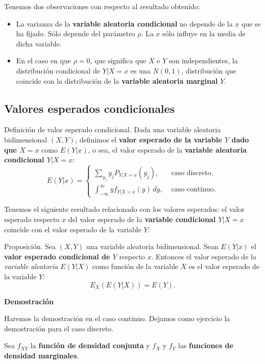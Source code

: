 \documentclass[]{book}
\begin{document}
Tenemos dos observaciones con respecto al resultado obtenido:

\begin{itemize}
\item
  La varianza de la \textbf{variable aleatoria condicional} no depende de la \(x\) que se ha fijado. Sólo depende del parámetro \(\rho\). La \(x\) sólo influye en la media de dicha variable.
\item
  En el caso en que \(\rho=0\), que significa que \(X\) e \(Y\) son independientes, la distribución condicional de \(Y|X=x\) es una \(N(0,1)\), distribución que coincide con la distribución de la \textbf{variable aleatoria marginal} \(Y\).
\end{itemize}

\hypertarget{valores-esperados-condicionales}{%
\subsection{Valores esperados condicionales}\label{valores-esperados-condicionales}}

Definición de valor esperado condicional.
Dada una variable aleatoria bidimensional \((X,Y)\), definimos el \textbf{valor esperado de la variable \(Y\) dado que \(X=x\)} como \(E(Y|x)\), o sea, el valor esperado de la \textbf{variable aleatoria condicional \(Y|X=x\)}:
\[
E(Y|x)=\begin{cases}
\sum_{y_j} y_j P_{Y|X=x}(y_j), & \mbox{ caso discreto,}\\
\int_{-\infty}^\infty y f_{Y|X=x}(y)\,dy, & \mbox{ caso continuo.}
\end{cases}
\]

Tenemos el siguiente resultado relacionado con los valores esperados: el valor esperado respecto \(x\) del valor esperado de la \textbf{variable condicional \(Y|X=x\)} coincide con el valor esperado de la variable \(Y\):

Proposición.
Sea \((X,Y)\) una variable aleatoria bidimensional. Sean \(E(Y|x)\) el \textbf{valor esperado condicional de \(Y\)} respecto \(x\). Entonces el valor esperado de la \emph{variable aleatoria} \(E(Y|X)\) como función de la variable \(X\) es el valor esperado de la variable \(Y\):
\[
E_X(E(Y|X))=E(Y).
\]

\textbf{Demostración}

Haremos la demostración en el caso continuo. Dejamos como ejercicio la demostración para el caso discreto.

Sea \(f_{XY}\) la \textbf{función de densidad conjunta} y \(f_X\) y \(f_Y\) las \textbf{funciones de densidad marginales}.
\end{document}
